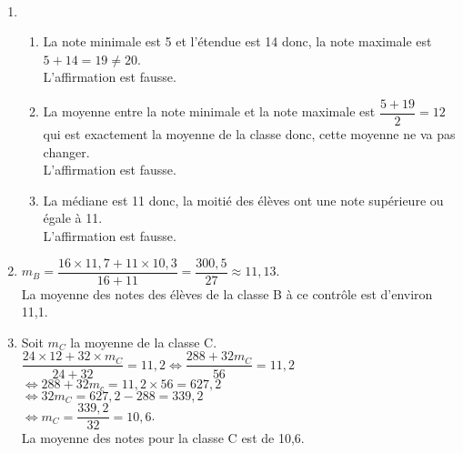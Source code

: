 \ \\ [-5mm]
   \begin{enumerate}
      \item
         \begin{enumerate}
            \item La note minimale est 5 et l'étendue est 14 donc, la note maximale est $5+14 =19\neq20$. \\
               {\blue L'affirmation est fausse}.
            \item La moyenne entre la note minimale et la note maximale est $\dfrac{5+19}{2} =12$ qui est exactement la moyenne de la classe donc, cette moyenne ne va pas changer. \\
               {\blue L'affirmation est fausse}.
            \item La médiane est 11 donc, la moitié des élèves ont une note supérieure ou égale à 11. \\
               {\blue L'affirmation est fausse}. \medskip
         \end{enumerate}
      \setcounter{enumi}{1}
      \item $m_B =\dfrac{16\times11,7+11\times10,3}{16+11} =\dfrac{300,5}{27} \approx11,13$. \\ [1mm]
         {\blue La moyenne des notes des élèves de la classe B à ce contrôle est d'environ 11,1}. \smallskip
      \item Soit $m_C$ la moyenne de la classe C. \\ [1mm]
         $\dfrac{24\times12+32\times m_C}{24+32} =11,2 \iff \dfrac{288+32m_C}{56} =11,2$ \\ [2mm]
         \hspace*{3.8cm} $\iff 288+32m_c =11,2\times56 =627,2$ \\ [1mm]
         \hspace*{3.8cm} $\iff 32m_C =627,2-288 =339,2$ \\ [2mm]
         \hspace*{3.8cm} $\iff m_C =\dfrac{339,2}{32} =10,6$. \\ [2mm]
         {\blue La moyenne des notes pour la classe C est de 10,6}.
   \end{enumerate}

